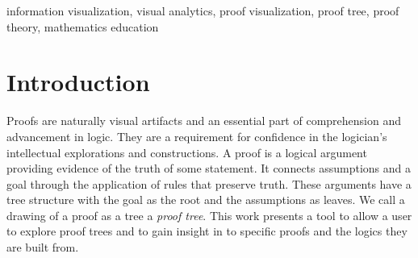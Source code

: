 \documentclass[conference]{IEEEtran}
\begin{document}
\newcommand{\sentencefive}{The proof visualization tool allows either open exploration of a proof or a directed walk-through, revealing supplementary information to serve as a form of discourse as the nodes are visited.}


\newcommand{\sentencesix}{This work provides a tool for gaining understanding of the structure of proofs, insight into the processes used in constructing such proofs, and also serves as a starting point for visualizations of proof trees in more complicated logics.}




\begin{abstract}
    \sentenceone{} \sentencetwo{} \sentencethree{} \sentencefour{} \sentencefive{} \sentencesix{}
\end{abstract}


\begin{IEEEkeywords}
    information visualization, visual analytics, proof visualization, proof tree, proof theory, mathematics education
\end{IEEEkeywords}


\section{Introduction}
\label{sec:intro}

Proofs are naturally visual artifacts and an essential part of comprehension and advancement in logic. They are a requirement for confidence in the logician's intellectual explorations and constructions. A proof is a logical argument providing evidence of the truth of some statement. It connects assumptions and a goal through the application of rules that preserve truth. These arguments have a tree structure with the goal as the root and the assumptions as leaves. We call a drawing of a proof as a tree a \textit{proof tree}. This work presents a tool to allow a user to explore proof trees and to gain insight in to specific proofs and the logics they are built from.
\end{document}
